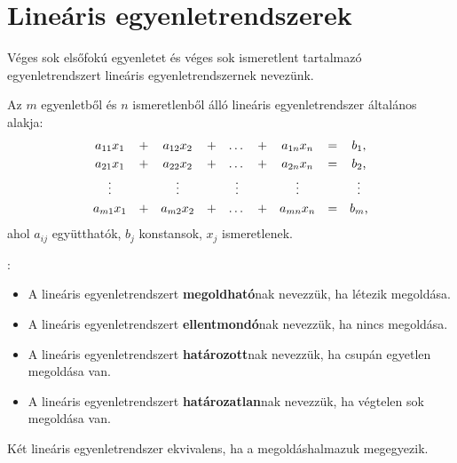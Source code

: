 \clearpage
\section{Lineáris egyenletrendszerek}\label{sec-01-03}

\begin{definition}
  Véges sok elsőfokú egyenletet és véges sok ismeretlent tartalmazó
  egyenletrendszert lineáris egyenletrendszernek nevezünk.

  Az $m$ egyenletből és $n$ ismeretlenből álló lineáris egyenletrendszer
  általános alakja:
  $$
    \begin{array}{*{9}{c}}
      a_{11} x_{1} & + & a_{12} x_{2} & + & \dots  & + & a_{1n} x_{n} & = & b_{1}\text, \\[1mm]
      a_{21} x_{1} & + & a_{22} x_{2} & + & \dots  & + & a_{2n} x_{n} & = & b_{2}\text, \\[1mm]
      \vdots       &   & \vdots       &   & \vdots &   & \vdots       &   & \vdots      \\[1mm]
      a_{m1} x_{1} & + & a_{m2} x_{2} & + & \dots  & + & a_{mn} x_{n} & = & b_{m}\text,
    \end{array}
  $$
  ahol $a_{ij}$ együtthatók, $b_{j}$ konstansok, $x_{j}$ ismeretlenek.
\end{definition}

\begin{blueBox}
  :

  \begin{itemize}
    \item A lineáris egyenletrendszert \textbf{megoldható}nak nevezzük,
          ha létezik megoldása.

    \item A lineáris egyenletrendszert \textbf{ellentmondó}nak nevezzük,
          ha nincs megoldása.

    \item A lineáris egyenletrendszert \textbf{határozott}nak nevezzük,
          ha csupán egyetlen megoldása van.

    \item A lineáris egyenletrendszert \textbf{határozatlan}nak nevezzük,
          ha végtelen sok megoldása van.
  \end{itemize}
\end{blueBox}

\begin{definition}
  Két lineáris egyenletrendszer ekvivalens, ha a megoldáshalmazuk megegyezik.
\end{definition}

